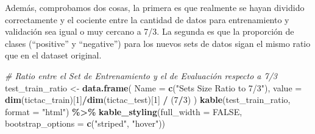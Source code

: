 \documentclass[
]{article}
\newenvironment{Shaded}{\begin{snugshade}}{\end{snugshade}}
\newcommand{\AttributeTok}[1]{\textcolor[rgb]{0.13,0.29,0.53}{#1}}
\newcommand{\CommentTok}[1]{\textcolor[rgb]{0.56,0.35,0.01}{\textit{#1}}}
\newcommand{\ConstantTok}[1]{\textcolor[rgb]{0.56,0.35,0.01}{#1}}
\newcommand{\DecValTok}[1]{\textcolor[rgb]{0.00,0.00,0.81}{#1}}
\newcommand{\FunctionTok}[1]{\textcolor[rgb]{0.13,0.29,0.53}{\textbf{#1}}}
\newcommand{\NormalTok}[1]{#1}
\newcommand{\OtherTok}[1]{\textcolor[rgb]{0.56,0.35,0.01}{#1}}
\newcommand{\SpecialCharTok}[1]{\textcolor[rgb]{0.81,0.36,0.00}{\textbf{#1}}}
\newcommand{\StringTok}[1]{\textcolor[rgb]{0.31,0.60,0.02}{#1}}
\begin{document}
Además, comprobamos dos cosas, la primera es que realmente se hayan
dividido correctamente y el cociente entre la cantidad de datos para
entrenamiento y validación sea igual o muy cercano a 7/3. La segunda es
que la proporción de clases (``positive'' y ``negative'') para los
nuevos sets de datos sigan el mismo ratio que en el dataset original.

\begin{Shaded}
\begin{Highlighting}[]
\CommentTok{\# Ratio entre el Set de Entrenamiento y el de Evaluación respecto a 7/3}
\NormalTok{test\_train\_ratio }\OtherTok{\textless{}{-}} \FunctionTok{data.frame}\NormalTok{(}
  \AttributeTok{Name =} \FunctionTok{c}\NormalTok{(}\StringTok{"Sets Size Ratio to 7/3"}\NormalTok{),}
  \AttributeTok{value =} \FunctionTok{dim}\NormalTok{(tictac\_train)[}\DecValTok{1}\NormalTok{]}\SpecialCharTok{/}\FunctionTok{dim}\NormalTok{(tictac\_test)[}\DecValTok{1}\NormalTok{] }\SpecialCharTok{/}\NormalTok{ (}\DecValTok{7}\SpecialCharTok{/}\DecValTok{3}\NormalTok{)}
\NormalTok{)}
\FunctionTok{kable}\NormalTok{(test\_train\_ratio, }\AttributeTok{format =} \StringTok{"html"}\NormalTok{) }\SpecialCharTok{\%\textgreater{}\%}
  \FunctionTok{kable\_styling}\NormalTok{(}\AttributeTok{full\_width =} \ConstantTok{FALSE}\NormalTok{, }\AttributeTok{bootstrap\_options =} \FunctionTok{c}\NormalTok{(}\StringTok{"striped"}\NormalTok{, }\StringTok{"hover"}\NormalTok{))}


\end{Highlighting}
\end{Shaded}
\end{document}
